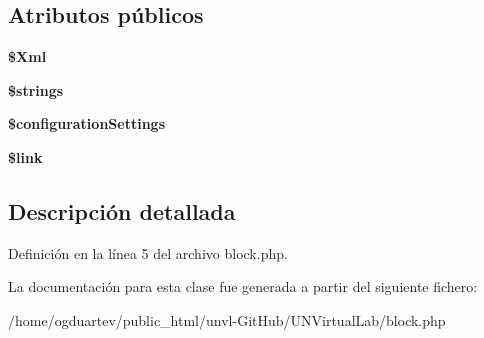 \subsection*{Atributos públicos}
\begin{DoxyCompactItemize}
\item 
\mbox{\label{classblock_a1c94cbb3bc0af9407e08d5bf372c1a45}} 
{\bfseries \$\+Xml}
\item 
\mbox{\label{classblock_a253606399d635e084dee7745be77f925}} 
{\bfseries \$strings}
\item 
\mbox{\label{classblock_a7793d302164a793a4b94620e90f019f1}} 
{\bfseries \$configuration\+Settings}
\item 
\mbox{\label{classblock_a1c92cf0a771c8625989ab5dc04c22286}} 
{\bfseries \$link}
\end{DoxyCompactItemize}


\subsection{Descripción detallada}


Definición en la línea 5 del archivo block.\+php.



La documentación para esta clase fue generada a partir del siguiente fichero\+:\begin{DoxyCompactItemize}
\item 
/home/ogduartev/public\+\_\+html/unvl-\/\+Git\+Hub/\+U\+N\+Virtual\+Lab/block.\+php\end{DoxyCompactItemize}
